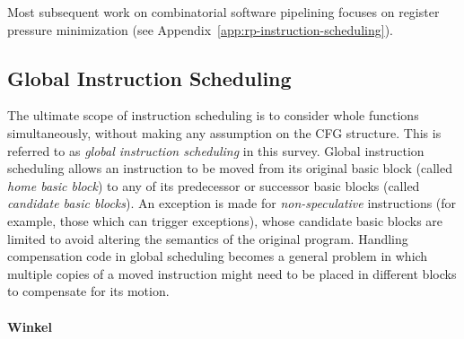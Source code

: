 \documentclass[acmsmall,authorversion,nonacm]{acmart}
\begin{document}
Most subsequent work on combinatorial software pipelining focuses on
register pressure minimization (see
Appendix~\ref{app:rp-instruction-scheduling}).

\subsection{Global Instruction Scheduling}
\label{sec:global-instruction-scheduling}

The ultimate scope of instruction scheduling is to consider whole
functions simultaneously, without making any assumption on the CFG
structure.
This is referred to as \emph{global instruction scheduling} in this
survey.
Global instruction scheduling allows an instruction to be moved from
its original basic block (called \emph{home basic block}) to any of
its predecessor or successor basic blocks (called \emph{candidate
  basic blocks}).
An exception is made for \emph{non-speculative} instructions (for
example, those which can trigger exceptions), whose candidate basic
blocks are limited to avoid altering the semantics of the original
program.
Handling compensation code in global scheduling becomes a general
problem in which multiple copies of a moved instruction might need to
be placed in different blocks to compensate for its motion.

\paragraph{Winkel}
\end{document}
